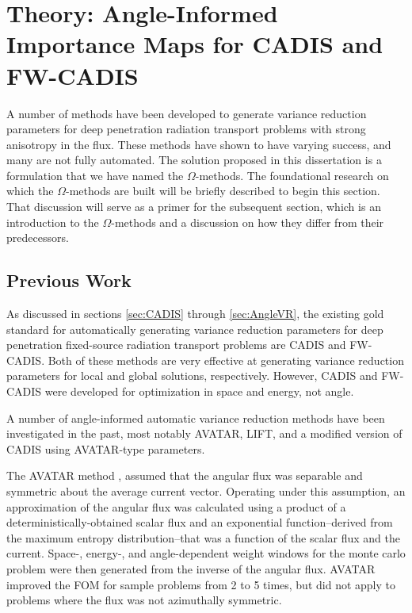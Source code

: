 \section{Theory: Angle-Informed Importance Maps for CADIS and FW-CADIS}
\label{sec:methodtheory}

A number of methods have been developed to generate variance reduction parameters
for deep penetration radiation transport problems with strong anisotropy in the
flux. These methods have shown to have varying success, and many are not fully
automated. The solution proposed in this dissertation is a formulation that we
have named the $\Omega$-methods. The foundational research
on which the $\Omega$-methods are built will be briefly described to begin this
section. That discussion will serve as a primer for the subsequent section, which
is an introduction to the $\Omega$-methods and a discussion on how they differ
from their predecessors.

\subsection{Previous Work}
\label{sec:omegabknd}

As discussed in sections \ref{sec:CADIS}
through \ref{sec:AngleVR}, the existing gold standard for automatically
generating variance reduction parameters for deep penetration
fixed-source radiation transport problems are
CADIS and FW-CADIS. Both of these methods are very effective at
generating variance reduction parameters for local and global solutions,
respectively. However, CADIS and FW-CADIS were developed for optimization in
space and energy, not angle.

A number of angle-informed automatic variance reduction methods have been
investigated in the past, most notably AVATAR, LIFT, and a modified version of
CADIS using AVATAR-type parameters.

The AVATAR method
\cite{van_riper_generation_1995, van_riper_avatarautomatic_1997}, assumed that
the angular flux was separable and symmetric about the average current vector.
Operating under this assumption, an approximation of the angular
flux was calculated using
a product of a deterministically-obtained
scalar flux and an exponential function--derived from the
maximum entropy distribution--that was a function of the scalar flux and the
current. Space-, energy-, and angle-dependent weight windows for
the monte carlo problem were then generated from the inverse of the angular
flux. AVATAR improved the FOM for sample problems from 2 to 5 times, but did not
apply to problems where the flux was not azimuthally symmetric.

